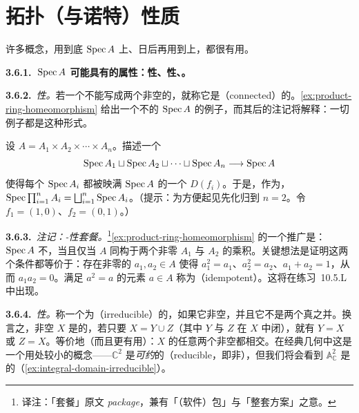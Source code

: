 
\section{拓扑（与诺特）性质}

许多\trTopology{}概念，用到底\trTopologicalSpace{} $\operatorname{Spec} A$ 上、日后再用到\trScheme{}上，都很有用。

\textbf{3.6.1.\ $\operatorname{Spec} A$ 可能具有的\trTopology{}属性：\trConnected{}性、\trIrreducible{}性、\trQuasicompactness{}。}

\textbf{3.6.2.}\ \emph{\trConnected{}性。}\quad 若一个\trTopologicalSpace{}不能写成两个非空\trOpenSet{}的\trDisjointUnion，就称它是\textbf{\trConnected}（connected）的。\cref{ex:product-ring-homeomorphism} 给出一个不\trConnected{}的 $\operatorname{Spec} A$ 的例子，而其后的注记将解释：一切例子都是这种形式。

\begin{exercise}\label{ex:product-ring-homeomorphism}
设 $A=A_1\times A_2\times\cdots\times A_n$。描述一个\trHomeomorphism
\[
\operatorname{Spec} A_1\sqcup\operatorname{Spec} A_2\sqcup\cdots\sqcup\operatorname{Spec} A_n\longrightarrow\operatorname{Spec} A
\]
使得每个 $\operatorname{Spec} A_i$ 都被映满 $\operatorname{Spec} A$ 的一个\trDistinguishedOpen{} $D(f_i)$。于是，作为\trTopologicalSpace，$\operatorname{Spec}\prod_{i=1}^{n}A_i=\bigsqcup_{i=1}^{n}\operatorname{Spec} A_i$。（提示：为方便起见先化归到 $n=2$。令 $f_1=(1,0)$、$f_2=(0,1)$。）
\end{exercise}

\textbf{3.6.3.}\ \emph{注记：\trIdempotent{}-\trConnected{}性套餐。}\footnote{译注：「套餐」原文 \emph{package}，兼有「（软件）包」与「整套方案」之意。}\quad \cref{ex:product-ring-homeomorphism} 的一个推广是：$\operatorname{Spec} A$ 不\trConnected，当且仅当 $A$ 同构于两个非零\trRing{} $A_1$ 与 $A_2$ 的乘积。关键想法是证明这两个条件都等价于：存在非零的 $a_1,a_2\in A$ 使得 $a_1^2=a_1$、$a_2^2=a_2$、$a_1+a_2=1$，从而 $a_1a_2=0$。满足 $a^2=a$ 的元素 $a\in A$ 称为\textbf{\trIdempotent{}}（idempotent）。这将在练习~10.5.L 中出现。

\textbf{3.6.4.}\ \emph{\trIrreducible{}性。}\quad 称一个\trTopologicalSpace{}为\textbf{\trIrreducible}（irreducible）的，如果它非空，并且它不是两个真\trClosedSubset{}之并。换言之，非空\trTopologicalSpace{} $X$ 是\trIrreducible{}的，若只要 $X=Y\cup Z$（其中 $Y$ 与 $Z$ 在 $X$ 中闭），就有 $Y=X$ 或 $Z=X$。等价地（而且更有用）：$X$ 的任意两个非空\trOpenSubset{}都相交。在经典几何中这是一个用处较小的概念——$\mathbb{C}^2$ 是\emph{可约}的（reducible，即非\trIrreducible），但我们将会看到 $\mathbb{A}^2_{\mathbb{C}}$ 是\trIrreducible{}的（\cref{ex:integral-domain-irreducible}）。

